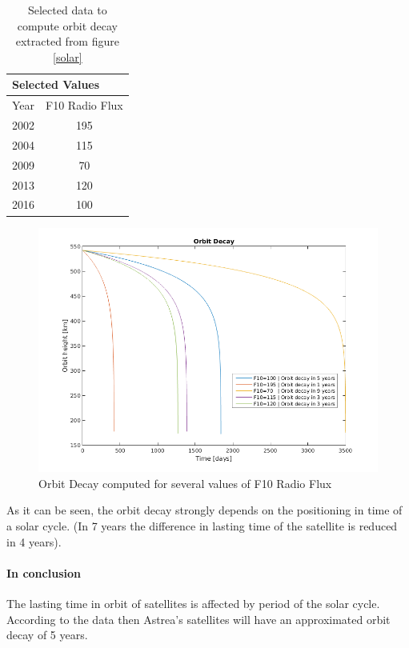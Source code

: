 \begin{table}[]
\centering

\begin{tabular}{|l|c|}
\hline
\multicolumn{2}{|l|}{Selected Values}      \\ \hline
Year & \multicolumn{1}{l|}{F10 Radio Flux} \\ \hline
2002 & 195                                 \\ \hline
2004 & 115                                 \\ \hline
2009 & 70                                  \\ \hline
2013 & 120                                 \\ \hline
2016 & 100                                 \\ \hline
\end{tabular}
\caption{Selected data to compute orbit decay extracted from figure \ref{solar}}
\label{OrbDecCompT}
\end{table}  
\begin{figure}[H] %
\centering
\includegraphics[width=.8\textwidth]{OrbitDecayComp.png}
\caption{Orbit Decay computed for several values of F10 Radio Flux}
\label{fig:OrbitDecayComp}
\end{figure}

As it can be seen, the orbit decay strongly depends on the positioning in time of a solar cycle. (In 7 years the difference in lasting time of the satellite is reduced in 4 years).

\paragraph{In conclusion}
The lasting time in orbit of satellites is affected by period of the solar cycle. According to the data then Astrea's satellites will have an approximated orbit decay of 5 years.


 